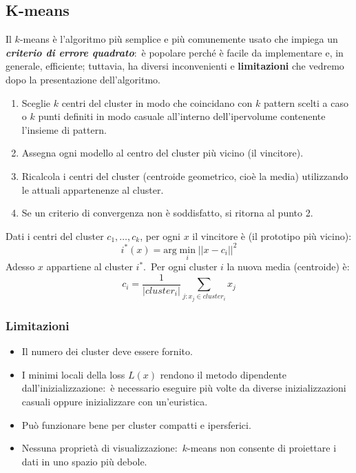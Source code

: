 \subsection{K-means}

Il $k$-means è l'algoritmo più semplice e più comunemente usato che impiega un \textbf{\textit{criterio di errore quadrato}}:\ è popolare perché è facile da implementare e, in generale, efficiente; tuttavia, ha diversi inconvenienti e \textbf{limitazioni} che vedremo dopo la presentazione dell'algoritmo.

\begin{enumerate}
	\item Sceglie $k$ centri del cluster in modo che coincidano con $k$ pattern scelti a caso o $k$ punti definiti in modo casuale all'interno dell'ipervolume contenente l'insieme di pattern.
	\item Assegna ogni modello al centro del cluster più vicino (il vincitore).
	\item Ricalcola i centri del cluster (centroide geometrico, cioè la media) utilizzando le attuali appartenenze al cluster.
	\item Se un criterio di convergenza non è soddisfatto, si ritorna al punto 2.
\end{enumerate}

\noindent Dati i centri del cluster $c_1,\dots,c_k$, per ogni $x$ il vincitore è (il prototipo più vicino):
\[i^*(x) = \mathrm{arg}\min_i ||x-c_i||^2\]
Adesso $x$ appartiene al cluster $i^*$.\
Per ogni cluster $i$ la nuova media (centroide) è:
\[c_i = \frac{1}{|\mathit{cluster}_i|}\sum_{j:x_j\in\mathit{cluster}_i} x_j\]

\subsubsection{Limitazioni}

\begin{itemize}
	\item Il numero dei cluster deve essere fornito.
	\item I minimi locali della loss $L(x)$ rendono il metodo dipendente dall'inizializzazione:\ è necessario eseguire più volte da diverse inizializzazioni casuali oppure inizializzare con un'euristica.\
	\item Può funzionare bene per cluster compatti e ipersferici.
	\item Nessuna proprietà di visualizzazione:\ $k$-means non consente di proiettare i dati in uno spazio più debole.
\end{itemize}

